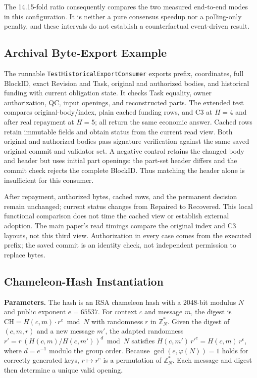 The 14.15-fold ratio consequently compares the two measured
end-to-end modes in this configuration. It is neither a pure consensus
speedup nor a polling-only penalty, and these intervals do not establish
a counterfactual event-driven result.

\subsection{Archival Byte-Export Example}
The runnable \texttt{TestHistoricalExportConsumer} exports prefix,
coordinates, full BlockID, exact Revision and Task, original and authorized
bodies, and historical funding with current obligation state. It checks
Task equality, owner authorization, QC, input openings, and reconstructed
parts. The extended test compares original-body/index, plain cached
funding rows, and C3 at $H=4$ and after real repayment at $H=5$; all return
the same economic answer. Cached rows retain immutable fields and obtain
status from the current read view. Both original and authorized bodies
pass signature verification against the same saved original commit and
validator set. A negative control retains the changed body and header
but uses initial part openings: the part-set header differs and the
commit check rejects the complete BlockID. Thus matching the header
alone is insufficient for this consumer.

After repayment, authorized bytes, cached rows, and the permanent decision
remain unchanged; current status changes from Repaired to Recovered.
This local functional comparison does not time the cached view or establish
external adoption. The main paper's read timings compare the original
index and C3 layouts, not this third view. Authorization in every case
comes from the executed prefix; the saved commit is an identity check,
not independent permission to replace bytes.

\subsection{Chameleon-Hash Instantiation}
\label{sec:ch-params}

\noindent\textbf{Parameters.} The hash is an RSA chameleon hash with a 2048-bit modulus $N$ and public exponent $e=65537$. For context $c$ and message $m$, the digest is $\mathrm{CH}=H(c,m)\cdot r^{e}\bmod N$ with randomness $r$ in $\mathbb{Z}_N^{*}$. Given the digest of $(c,m,r)$ and a new message $m'$, the adapted randomness $r'=r\,(H(c,m)/H(c,m'))^{d}\bmod N$ satisfies $H(c,m')\,r'^{e}=H(c,m)\,r^{e}$, where $d=e^{-1}$ modulo the group order. Because $\gcd(e,\varphi(N))=1$ holds for correctly generated keys, $r\mapsto r^e$ is a permutation of $\mathbb{Z}_N^{*}$. Each message and digest then determine a unique valid opening.

